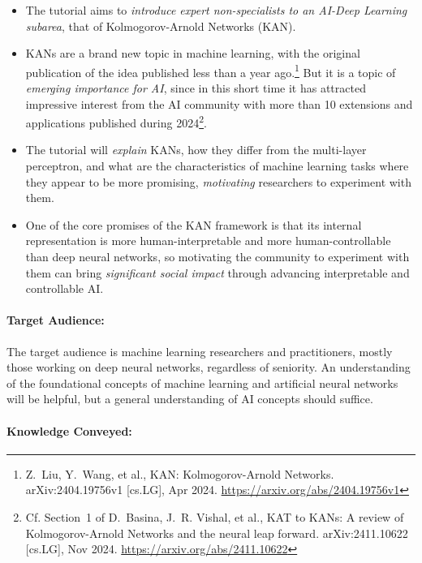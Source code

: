 \documentclass{ecai}
\begin{document}
\begin{itemize}
\item The tutorial aims to
  \emph{introduce expert non-specialists to an AI-Deep Learning subarea},
  that of Kolmogorov-Arnold Networks (KAN).
%
\item KANs are a brand new topic in machine learning, with the
  original publication of the idea published less than a year
  ago.\footnote{Z.~Liu, Y.~Wang, et al., KAN: Kolmogorov-Arnold
    Networks. arXiv:2404.19756v1 [cs.LG], Apr 2024.
    \url{https://arxiv.org/abs/2404.19756v1}}
  But it is a topic of \emph{emerging importance for AI}, since
  in this short time it has attracted impressive
  interest from the AI community with more than 10 extensions and
  applications published during 2024\footnote{Cf. Section~1 of
    D.~Basina, J.~R. Vishal, et al., 
    KAT to KANs: A review of Kolmogorov-Arnold Networks and the
    neural leap forward. arXiv:2411.10622 [cs.LG], Nov 2024.
    \url{https://arxiv.org/abs/2411.10622}}.
\item The tutorial will \emph{explain} KANs, how they differ from the
  multi-layer perceptron, and what are the characteristics of machine
  learning tasks where they appear to be more promising,
  \emph{motivating} researchers to experiment with them.
\item One of the core promises of the KAN framework is that its
  internal representation is more human-interpretable and more
  human-controllable than deep neural networks, so motivating the
  community to experiment with them can bring
  \emph{significant social impact} through advancing interpretable
  and controllable AI.
\end{itemize}  

\paragraph{Target Audience:}

The target audience is machine learning researchers and practitioners,
mostly those working on deep neural networks, regardless of seniority.
An understanding of the foundational concepts of machine learning and
artificial neural networks will be helpful, but a general
understanding of AI concepts should suffice.


\paragraph{Knowledge Conveyed:}
\end{document}
